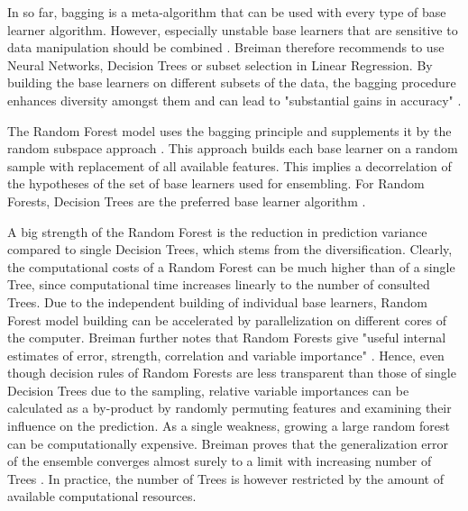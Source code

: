 \documentclass[12pt]{article}
\begin{document}
In so far, bagging is a meta-algorithm that can be used with every type of base learner algorithm. However, especially unstable base learners that are sensitive to data manipulation should be combined \citep[p.124]{breiman1996bagging}. Breiman therefore recommends to use Neural Networks, Decision Trees	or subset selection in Linear Regression. By building the base learners on different subsets of the data, the bagging procedure enhances diversity amongst them and can lead to "substantial gains in accuracy" \citep[p.123]{breiman1996bagging}.

The Random Forest model uses the bagging principle and supplements it by the random subspace approach \citep{ho1998random, breiman2001random}. This approach builds each base learner on a random sample with replacement of all available features. This implies a decorrelation of the hypotheses of the set of base learners used for ensembling. For Random Forests, Decision Trees are the preferred base learner algorithm \citep[cp.][]{breiman2001random}.

A big strength of the Random Forest is the reduction in prediction variance compared to single Decision Trees, which stems from the diversification. Clearly, the computational costs of a Random Forest can be much higher than of a single Tree, since computational time increases linearly to the number of consulted Trees. Due to the independent building of individual base learners, Random Forest model building can be accelerated by parallelization on different cores of the computer. Breiman further notes that Random Forests give "useful internal estimates of error, strength, correlation and variable importance" \citep[p.10]{breiman2001random}. Hence, even though decision rules of Random Forests are less transparent than those of single Decision Trees due to the sampling, relative variable importances can be calculated as a by-product by randomly permuting features and examining their influence on the prediction. As a single weakness, growing a large random forest can be computationally expensive. Breiman proves that the generalization error of the ensemble converges almost surely to a limit with increasing number of Trees \citep[p.30]{breiman2001random}. In practice, the number of Trees is however restricted by the amount of available computational resources.

\end{document}
